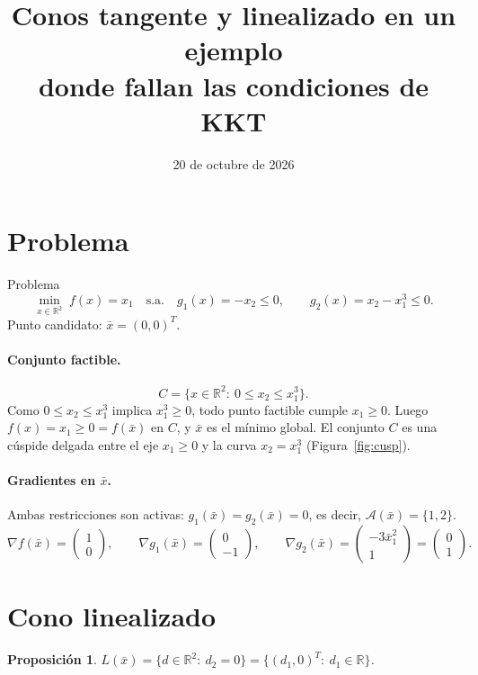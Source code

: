 \documentclass[11pt]{article}
\title{Conos tangente y linealizado en un ejemplo\\donde fallan las condiciones de KKT}
\date{20 de octubre de 2026}
\newtheorem{proposicion}{Proposición}
\begin{document}
\maketitle

\section{Problema}

\begin{obsbox}{Problema}
\[
\min_{x\in\mathbb{R}^2}\; f(x)=x_1
\quad\text{s.a.}\quad
g_1(x)=-x_2\le 0,\qquad g_2(x)=x_2-x_1^3\le 0 .
\]
Punto candidato: $\bar x=(0,0)^T$.
\end{obsbox}

\paragraph{Conjunto factible.}
\[
C=\{x\in\mathbb{R}^2:\ 0\le x_2\le x_1^3\}.
\]
Como $0\le x_2\le x_1^3$ implica $x_1^3\ge 0$, todo punto factible cumple $x_1\ge 0$. Luego $f(x)=x_1\ge 0=f(\bar x)$ en $C$, y $\bar x$ es el mínimo global. El conjunto $C$ es una cúspide delgada entre el eje $x_1\ge 0$ y la curva $x_2=x_1^3$ (Figura~\ref{fig:cusp}).

\paragraph{Gradientes en $\bar x$.}
Ambas restricciones son activas: $g_1(\bar x)=g_2(\bar x)=0$, es decir, $\mathcal A(\bar x)=\{1,2\}$.
\[
\nabla f(\bar x)=\begin{pmatrix}1\\0\end{pmatrix},\qquad
\nabla g_1(\bar x)=\begin{pmatrix}0\\-1\end{pmatrix},\qquad
\nabla g_2(\bar x)=\begin{pmatrix}-3\bar x_1^2\\ 1\end{pmatrix}=\begin{pmatrix}0\\1\end{pmatrix}.
\]

\section{Cono linealizado}

\begin{proposicion}
$L(\bar x)=\{d\in\mathbb{R}^2:\ d_2=0\}=\{(d_1,0)^T:\ d_1\in\mathbb{R}\}$.
\end{proposicion}
\end{document}
